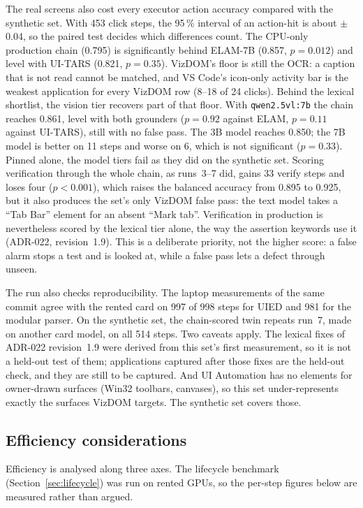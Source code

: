 \documentclass[11pt,a4paper]{article}
\newcommand{\code}[1]{\texttt{#1}}
\begin{document}
The real screens also cost every executor action accuracy compared with the synthetic
set. With 453 click steps, the 95\,\% interval of an action-hit is about $\pm$0.04, so
the paired test decides which differences count. The CPU-only production chain (0.795)
is significantly behind ELAM-7B (0.857, $p=0.012$) and level with UI-TARS (0.821,
$p=0.35$). VizDOM's floor is still the OCR: a caption that is not read cannot be
matched, and VS Code's icon-only activity bar is the weakest application for every
VizDOM row (8--18 of 24 clicks). Behind the lexical shortlist, the vision tier recovers
part of that floor. With \code{qwen2.5vl:7b} the chain reaches 0.861, level with both
grounders ($p=0.92$ against ELAM, $p=0.11$ against UI-TARS), still with no false pass.
The 3B model reaches 0.850; the 7B model is better on 11 steps and worse on 6, which is
not significant ($p=0.33$). Pinned alone, the model tiers fail as they did on the
synthetic set. Scoring verification through the whole chain, as runs~3--7 did,
gains 33 verify steps and loses four ($p<0.001$), which raises the balanced accuracy
from 0.895 to 0.925, but it also produces the set's only VizDOM false pass: the text
model takes a ``Tab Bar'' element for an absent ``Mark tab''. Verification in production
is nevertheless scored by the lexical tier alone, the way the assertion keywords use it
(ADR-022, revision~1.9). This is a deliberate priority, not the higher score: a false
alarm stops a test and is looked at, while a false pass lets a defect through unseen.

The run also checks reproducibility. The laptop measurements of the same commit
agree with the rented card on 997 of 998 steps for UIED and 981 for the modular
parser. On the synthetic set, the chain-scored twin repeats run~7, made on another
card model, on all 514 steps. Two caveats apply. The lexical fixes of ADR-022
revision~1.9 were derived from this set's first measurement, so it is not a held-out
test of them; applications captured after those fixes are the held-out check, and they
are still to be captured. And UI Automation has no elements for owner-drawn surfaces
(Win32 toolbars, canvases), so this set under-represents exactly the surfaces VizDOM
targets. The synthetic set covers those.

\subsection{Efficiency considerations}
Efficiency is analysed along three axes. The lifecycle benchmark
(Section~\ref{sec:lifecycle}) was run on rented GPUs, so the per-step figures below
are measured rather than argued.
\end{document}
